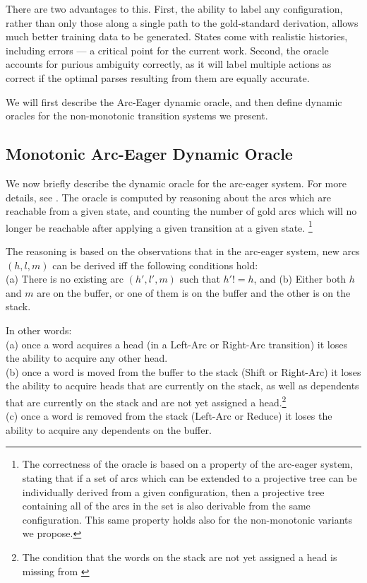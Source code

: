 \documentclass[11pt,letterpaper]{article}
\newcommand{\note}[1]{\textcolor{red}{#1}}
\begin{document}
There are two advantages to this. First, the ability to label any configuration,
rather than only those along a single path to the gold-standard derivation,
allows much better training data to be generated. States come with realistic
histories, including errors --- a critical point for the current work. Second,
the oracle accounts for purious ambiguity correctly, as it will label multiple actions
as correct if the optimal parses resulting from them are equally accurate.

We will first describe the Arc-Eager dynamic oracle, and then define dynamic
oracles for the non-monotonic transition systems we present.

\subsection{Monotonic Arc-Eager Dynamic Oracle}

We now briefly describe the dynamic oracle for the arc-eager system. For more
details, see \citet{goldberg:12}. The oracle is computed by reasoning about the
arcs which are reachable from a given state, and counting the number of gold
arcs which will no longer be reachable after applying a given transition at a
given state.
\footnote{The correctness of
the oracle is based on a property of the arc-eager system, stating that if a
set of arcs which can be extended to a projective tree can be individually
derived from a given configuration, then a projective tree containing all of
the arcs in the set is also derivable from the same configuration. This same
property holds also for the non-monotonic variants we propose.}

The reasoning is based on the observations that in the arc-eager system, new
arcs $(h,l,m)$ can be derived iff the following conditions hold:\\
(a) There is no existing arc $(h',l',m)$ such that $h'!=h$, and 
(b) Either both $h$ and $m$ are on the buffer, or one of them is on the buffer
and the other is on the stack.

\noindent In other words:\\
(a) once a word acquires a head (in a Left-Arc or Right-Arc transition) it loses the ability to acquire
any other head.\\
(b) once a word is moved from the buffer to the stack (Shift or Right-Arc) it loses the ability to
acquire heads that are currently on the stack, as well as dependents that are
currently on the stack and are not yet assigned a head.\footnote{The condition
that the words on the stack are not yet assigned a head is missing from
\citep{goldberg:12}}\\
(c) once a word is removed from the stack (Left-Arc or Reduce) it loses the
ability to acquire any dependents on the buffer.\\
\end{document}

